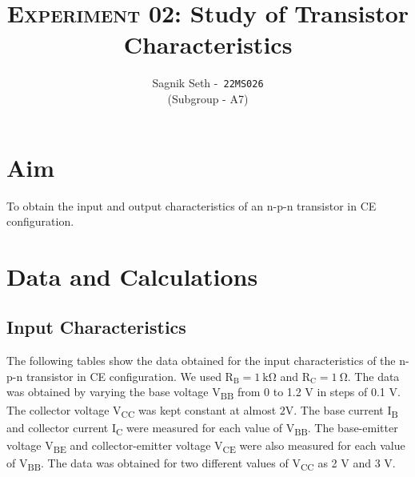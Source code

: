 \documentclass{scrartcl}
\title{
        \Large\textsc{Experiment 02: }
        \huge\textbf{Study of Transistor Characteristics} \\
}
\author{{\Large Sagnik Seth} -\   \texttt{22MS026}\\ ({\small Subgroup - A7}) }
\date{}
\begin{document}
\maketitle
\section{Aim}
To obtain the input and output characteristics of an n-p-n transistor in CE configuration.
 
\section{Data and Calculations}
\subsection{Input Characteristics}
The following tables show the data obtained for the input characteristics of the n-p-n transistor in CE configuration.  We used $\mathrm{R_B = 1 \ k\Omega}$ and $\mathrm{R_C = 1 \ \Omega}$. The data was obtained by varying the base voltage V\textsubscript{BB} from 0 to 1.2 V in steps of 0.1 V. The collector voltage V\textsubscript{CC} was kept constant at almost $\mathrm{2 V}$. The base current I\textsubscript{B} and collector current I\textsubscript{C} were measured for each value of V\textsubscript{BB}. The base-emitter voltage V\textsubscript{BE} and collector-emitter voltage V\textsubscript{CE} were also measured for each value of V\textsubscript{BB}. The data was obtained for two different values of V\textsubscript{CC} as 2 V and 3 V. 
\end{document}
